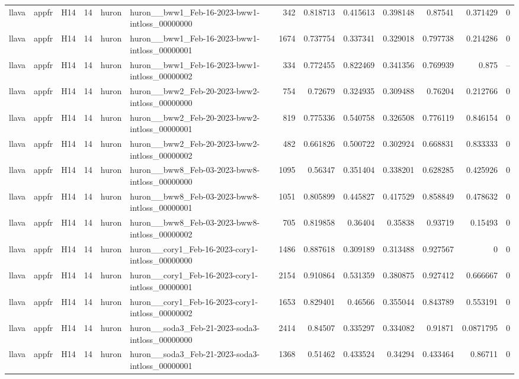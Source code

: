 \begin{longtable}{lllrllrrrrrrr}
llava & appfr & H14 & 14 & huron & huron\_\_bww1\_Feb-16-2023-bww1-intloss\_00000000 & 342 & 0.818713 & 0.415613 & 0.398148 & 0.87541 & 0.371429 & 0 \\
llava & appfr & H14 & 14 & huron & huron\_\_bww1\_Feb-16-2023-bww1-intloss\_00000001 & 1674 & 0.737754 & 0.337341 & 0.329018 & 0.797738 & 0.214286 & 0 \\
llava & appfr & H14 & 14 & huron & huron\_\_bww1\_Feb-16-2023-bww1-intloss\_00000002 & 334 & 0.772455 & 0.822469 & 0.341356 & 0.769939 & 0.875 & -- \\
llava & appfr & H14 & 14 & huron & huron\_\_bww2\_Feb-20-2023-bww2-intloss\_00000000 & 754 & 0.72679 & 0.324935 & 0.309488 & 0.76204 & 0.212766 & 0 \\
llava & appfr & H14 & 14 & huron & huron\_\_bww2\_Feb-20-2023-bww2-intloss\_00000001 & 819 & 0.775336 & 0.540758 & 0.326508 & 0.776119 & 0.846154 & 0 \\
llava & appfr & H14 & 14 & huron & huron\_\_bww2\_Feb-20-2023-bww2-intloss\_00000002 & 482 & 0.661826 & 0.500722 & 0.302924 & 0.668831 & 0.833333 & 0 \\
llava & appfr & H14 & 14 & huron & huron\_\_bww8\_Feb-03-2023-bww8-intloss\_00000000 & 1095 & 0.56347 & 0.351404 & 0.338201 & 0.628285 & 0.425926 & 0 \\
llava & appfr & H14 & 14 & huron & huron\_\_bww8\_Feb-03-2023-bww8-intloss\_00000001 & 1051 & 0.805899 & 0.445827 & 0.417529 & 0.858849 & 0.478632 & 0 \\
llava & appfr & H14 & 14 & huron & huron\_\_bww8\_Feb-03-2023-bww8-intloss\_00000002 & 705 & 0.819858 & 0.36404 & 0.35838 & 0.93719 & 0.15493 & 0 \\
llava & appfr & H14 & 14 & huron & huron\_\_cory1\_Feb-16-2023-cory1-intloss\_00000000 & 1486 & 0.887618 & 0.309189 & 0.313488 & 0.927567 & 0 & 0 \\
llava & appfr & H14 & 14 & huron & huron\_\_cory1\_Feb-16-2023-cory1-intloss\_00000001 & 2154 & 0.910864 & 0.531359 & 0.380875 & 0.927412 & 0.666667 & 0 \\
llava & appfr & H14 & 14 & huron & huron\_\_cory1\_Feb-16-2023-cory1-intloss\_00000002 & 1653 & 0.829401 & 0.46566 & 0.355044 & 0.843789 & 0.553191 & 0 \\
llava & appfr & H14 & 14 & huron & huron\_\_soda3\_Feb-21-2023-soda3-intloss\_00000000 & 2414 & 0.84507 & 0.335297 & 0.334082 & 0.91871 & 0.0871795 & 0 \\
llava & appfr & H14 & 14 & huron & huron\_\_soda3\_Feb-21-2023-soda3-intloss\_00000001 & 1368 & 0.51462 & 0.433524 & 0.34294 & 0.433464 & 0.86711 & 0 \\

\end{longtable}
